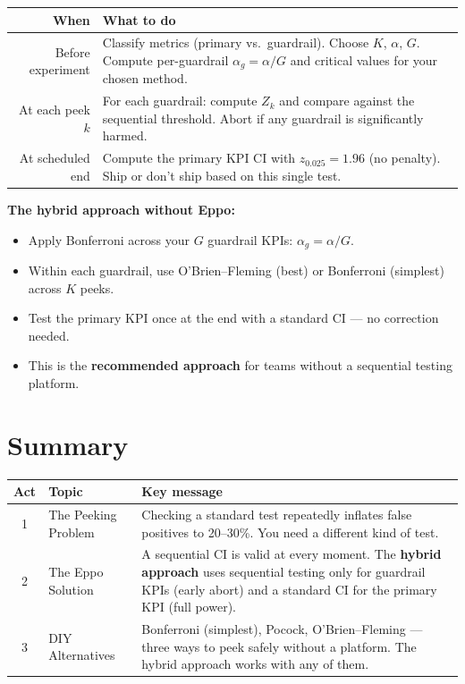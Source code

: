 \documentclass[12pt, a4paper]{article}
\begin{document}
\begin{center}
\renewcommand{\arraystretch}{1.3}
\begin{tabular}{@{} r p{10cm} @{}}
\toprule
\textbf{When} & \textbf{What to do} \\
\midrule
Before experiment
  & Classify metrics (primary vs.\ guardrail).  Choose $K$, $\alpha$, $G$.
    Compute per-guardrail $\alpha_g = \alpha / G$ and critical values for
    your chosen method. \\[4pt]
At each peek $k$
  & For each guardrail: compute $Z_k$ and compare against the sequential
    threshold.  Abort if any guardrail is significantly harmed. \\[4pt]
At scheduled end
  & Compute the primary KPI CI with $z_{0.025} = 1.96$ (no penalty).
    Ship or don't ship based on this single test. \\
\bottomrule
\end{tabular}
\end{center}

\begin{keytakeaway}
\textbf{The hybrid approach without Eppo:}
\begin{itemize}[nosep]
  \item Apply Bonferroni across your $G$ guardrail KPIs:
        $\alpha_g = \alpha / G$.
  \item Within each guardrail, use O'Brien--Fleming (best) or Bonferroni
        (simplest) across $K$ peeks.
  \item Test the primary KPI once at the end with a standard CI --- no
        correction needed.
  \item This is the \textbf{recommended approach} for teams without a
        sequential testing platform.
\end{itemize}
\end{keytakeaway}


\newpage
\section{Summary}

\begin{center}
\renewcommand{\arraystretch}{1.3}
\begin{tabular}{@{} c l p{7.5cm} @{}}
\toprule
\textbf{Act} & \textbf{Topic} & \textbf{Key message} \\
\midrule
1 & The Peeking Problem
  & Checking a standard test repeatedly inflates false positives to
    20--30\%.  You need a different kind of test. \\
2 & The Eppo Solution
  & A sequential CI is valid at every moment.  The \textbf{hybrid approach}
    uses sequential testing only for guardrail KPIs (early abort) and a
    standard CI for the primary KPI (full power). \\
3 & DIY Alternatives
  & Bonferroni (simplest), Pocock, O'Brien--Fleming --- three ways to
    peek safely without a platform.  The hybrid approach works with any
    of them. \\
\bottomrule
\end{tabular}
\end{center}
\end{document}
